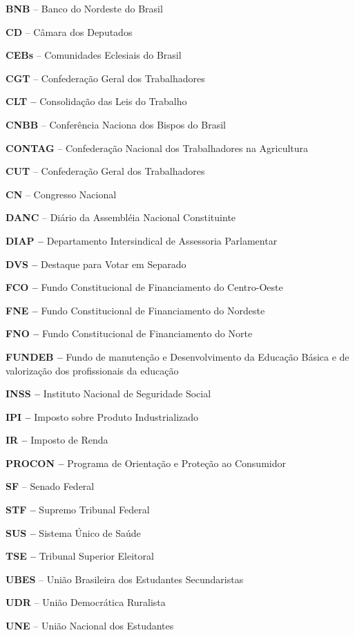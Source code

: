 \textbf{BNB} -- Banco do Nordeste do Brasil

\textbf{CD} -- Câmara dos Deputados

\textbf{CEBs} -- Comunidades Eclesiais do Brasil

\textbf{CGT} -- Confederação Geral dos Trabalhadores

\textbf{CLT --} Consolidação das Leis do Trabalho

\textbf{CNBB} -- Conferência Naciona dos Bispos do Brasil

\textbf{CONTAG} -- Confederação Nacional dos Trabalhadores na
Agricultura

\textbf{CUT} -- Confederação Geral dos Trabalhadores

\textbf{CN} -- Congresso Nacional

\textbf{DANC} -- Diário da Assembléia Nacional Constituinte

\textbf{DIAP --} Departamento Intersindical de Assessoria Parlamentar

\textbf{DVS --} Destaque para Votar em Separado

\textbf{FCO --} Fundo Constitucional de Financiamento do Centro-Oeste

\textbf{FNE --} Fundo Constitucional de Financiamento do Nordeste

\textbf{FNO --} Fundo Constitucional de Financiamento do Norte

\textbf{FUNDEB --} Fundo de manutenção e Desenvolvimento da Educação
Básica e de valorização dos profissionais da educação

\textbf{INSS --} Instituto Nacional de Seguridade Social

\textbf{IPI --} Imposto sobre Produto Industrializado

\textbf{IR --} Imposto de Renda

\textbf{PROCON --} Programa de Orientação e Proteção ao Consumidor

\textbf{SF} -- Senado Federal

\textbf{STF --} Supremo Tribunal Federal

\textbf{SUS --} Sistema Único de Saúde

\textbf{TSE --} Tribunal Superior Eleitoral

\textbf{UBES} -- União Brasileira dos Estudantes Secundaristas

\textbf{UDR} -- União Democrática Ruralista

\textbf{UNE} -- União Nacional dos Estudantes

\textbf{\\
}

